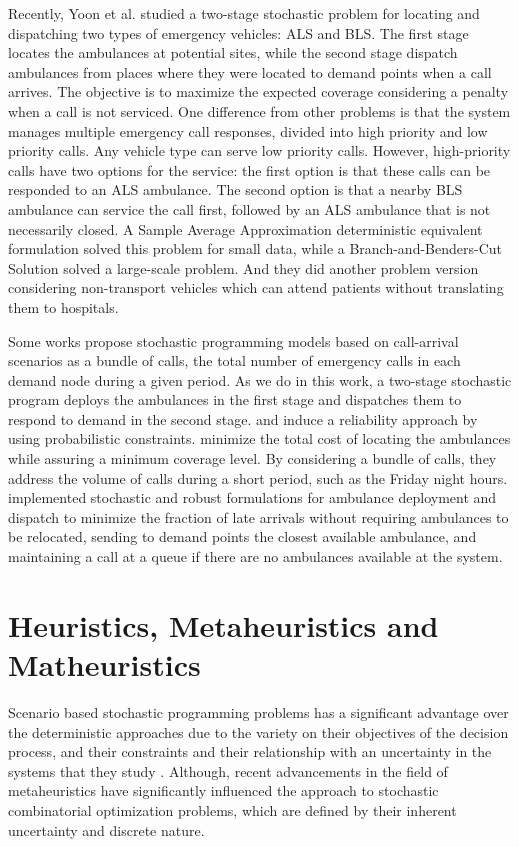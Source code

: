 Recently, Yoon et al. \cite{yoon2021stochastic} studied a two-stage stochastic problem for locating and dispatching two types of emergency vehicles: ALS and BLS. The first stage locates the ambulances at potential sites, while the second stage dispatch ambulances from places where they were located to demand points when a call arrives. The objective is to maximize the expected coverage considering a penalty when a call is not serviced. One difference from other problems is that the system manages multiple emergency call responses, divided into high priority and low priority calls. Any vehicle type can serve low priority calls. However, high-priority calls have two options for the service: the first option is that these calls can be responded to an ALS ambulance. The second option is that a nearby BLS ambulance can service the call first, followed by an ALS ambulance that is not necessarily closed. A Sample Average Approximation deterministic equivalent formulation solved this problem for small data, while a Branch-and-Benders-Cut Solution solved a large-scale problem. And they did another problem version considering non-transport vehicles which can attend patients without translating them to hospitals.

Some works propose stochastic programming models based on call-arrival sce\-na\-rios as a bundle of calls, the total number of emergency calls in each demand node during a given period. As we do in this work, a two-stage stochastic program deploys the ambulances in the first stage and dispatches them to respond to demand in the second stage. \citet{beraldi2009probabilistic} and \citet{noyan2010alternate} induce a reliability approach by using probabilistic constraints. \citet{nickel2016ambulance} minimize the total cost of locating the ambulances while assuring a minimum coverage level. By considering a bundle of calls, they address the volume of calls during a short period, such as the Friday night hours. \citet{bertsimas2019robust} implemented stochastic and robust formulations for ambulance deployment and dispatch to minimize the fraction of late arrivals without requiring ambulances to be relocated, sending to demand points the closest available ambulance, and maintaining a call at a queue if there are no ambulances available at the system. 

\section{Heuristics, Metaheuristics and Matheuristics}
Scenario based stochastic programming problems has a significant advantage over the deterministic approaches due to the variety on their objectives of the decision process, and their constraints and their relationship with an uncertainty in the systems that they study \cite{birge2011introduction}. Although, recent advancements in the field of me\-ta\-heu\-ris\-tics have significantly influenced the approach to stochastic combinatorial optimization problems, which are defined by their inherent uncertainty and discrete nature. 

